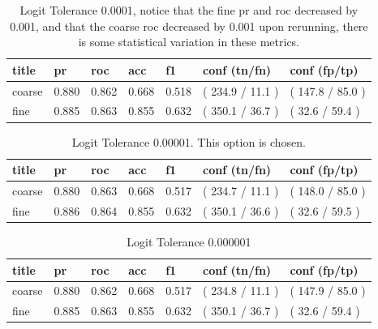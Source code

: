 \documentclass[ms]{nuthesis}
\begin{document}
\FloatBarrier
\begin{table}[H]
\centering
\caption{Logit Tolerance 0.0001, notice that the fine pr and roc decreased by 0.001, and that the
coarse roc decreased by 0.001 upon rerunning, there is some statistical variation in these metrics.}
\label{tab:LogRegOrig-0001}
\begin{tabular}{|l||l||l||l||l||l||l|}\toprule
title & pr & roc & acc & f1 & conf (tn/fn) & conf (fp/tp) \\ \midrule
coarse & 0.880 & 0.862 & 0.668 & 0.518 & ( 234.9 / 11.1 ) & ( 147.8 / 85.0 ) \\
fine & 0.885 & 0.863 & 0.855 & 0.632 & ( 350.1 / 36.7 ) & ( 32.6 / 59.4 ) \\ \bottomrule
\end{tabular}
\end{table}
\FloatBarrier




\FloatBarrier
\begin{table}[h]
\centering
\caption{Logit Tolerance 0.00001. This option is chosen.}
\label{tab:LogReg-00001Redo}
\begin{tabular}{|l||l||l||l||l||l||l|}\toprule
title & pr & roc & acc & f1 & conf (tn/fn) & conf (fp/tp) \\ \midrule
coarse & 0.880 & 0.863 & 0.668 & 0.517 & ( 234.7 / 11.1 ) & ( 148.0 / 85.0 ) \\
fine & 0.886 & 0.864 & 0.855 & 0.632 & ( 350.1 / 36.6 ) & ( 32.6 / 59.5 ) \\ \bottomrule
\end{tabular}
\end{table}
\FloatBarrier



\FloatBarrier
\begin{table}[H]
\centering
\caption{Logit Tolerance 0.000001}
\label{tab:LogReg-000001}
\begin{tabular}{|l||l||l||l||l||l||l|}\toprule
title & pr & roc & acc & f1 & conf (tn/fn) & conf (fp/tp) \\ \midrule
coarse & 0.880 & 0.862 & 0.668 & 0.517 & ( 234.8 / 11.1 ) & ( 147.9 / 85.0 ) \\
fine & 0.885 & 0.863 & 0.855 & 0.632 & ( 350.1 / 36.7 ) & ( 32.6 / 59.4 ) \\ \bottomrule
\end{tabular}
\end{table}
\FloatBarrier
\end{document}
